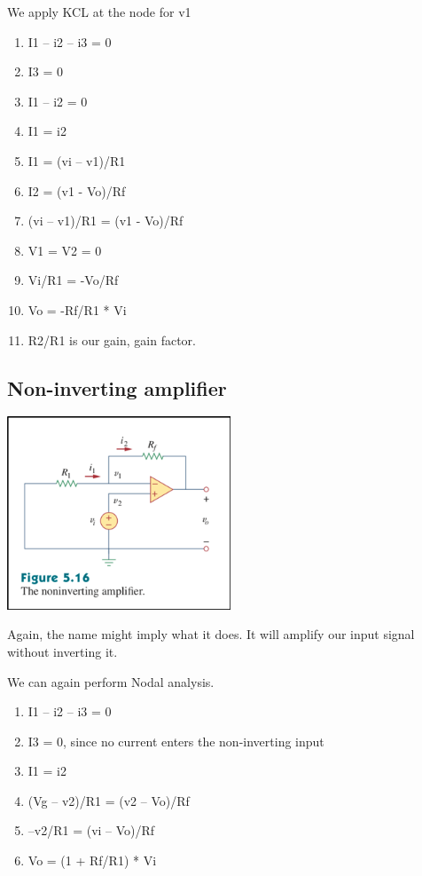 \documentclass[11pt]{book}
\begin{document}
We apply KCL at the node for v1
\begin{enumerate}
	\item I1 – i2 – i3 = 0
	\item I3 = 0
	\item I1 – i2 = 0
	\item I1 = i2
	\item I1 = (vi – v1)/R1
	\item I2 = (v1 - Vo)/Rf
	\item (vi – v1)/R1 = (v1 - Vo)/Rf
	\item V1 = V2 = 0
	\item Vi/R1 = -Vo/Rf
	\item Vo = -Rf/R1 * Vi
	\item R2/R1 is our gain, gain factor.
\end{enumerate}




\subsection{Non-inverting amplifier}
\includegraphics[width=0.5\textwidth]{figures/op-amp4}

Again, the name might imply what it does. It will amplify our input signal without inverting it.

We can again perform Nodal analysis.
\begin{enumerate}
	\item I1 – i2 – i3 = 0
	\item I3 = 0, since no current enters the non-inverting input
	\item I1 = i2
	\item (Vg – v2)/R1 = (v2 – Vo)/Rf
	\item –v2/R1 = (vi – Vo)/Rf
	\item Vo = (1 + Rf/R1) * Vi
\end{enumerate}
\end{document}
